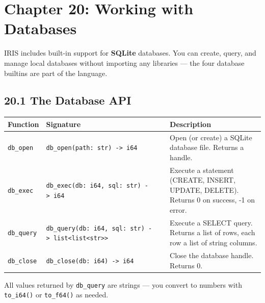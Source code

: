 \documentclass[
  english,
]{book}
\begin{document}
\section{Chapter 20: Working with
Databases}\label{chapter-20-working-with-databases}

IRIS includes built-in support for \textbf{SQLite} databases. You can
create, query, and manage local databases without importing any
libraries --- the four database builtins are part of the language.

\subsection{20.1 The Database API}\label{the-database-api}

\begin{longtable}[]{@{}
  >{\raggedright\arraybackslash}p{}
  >{\raggedright\arraybackslash}p{}
  >{\raggedright\arraybackslash}p{}@{}}
\toprule\noalign{}
\begin{minipage}[b]{\linewidth}\raggedright
Function
\end{minipage} & \begin{minipage}[b]{\linewidth}\raggedright
Signature
\end{minipage} & \begin{minipage}[b]{\linewidth}\raggedright
Description
\end{minipage} \\
\midrule\noalign{}
\endhead
\bottomrule\noalign{}
\endlastfoot
\texttt{db\_open} & \texttt{db\_open(path:\ str)\ -\textgreater{}\ i64}
& Open (or create) a SQLite database file. Returns a handle. \\
\texttt{db\_exec} &
\texttt{db\_exec(db:\ i64,\ sql:\ str)\ -\textgreater{}\ i64} & Execute
a statement (CREATE, INSERT, UPDATE, DELETE). Returns 0 on success, -1
on error. \\
\texttt{db\_query} &
\texttt{db\_query(db:\ i64,\ sql:\ str)\ -\textgreater{}\ list\textless{}list\textless{}str\textgreater{}\textgreater{}}
& Execute a SELECT query. Returns a list of rows, each row a list of
string columns. \\
\texttt{db\_close} & \texttt{db\_close(db:\ i64)\ -\textgreater{}\ i64}
& Close the database handle. Returns 0. \\
\end{longtable}

All values returned by \texttt{db\_query} are strings --- you convert to
numbers with \texttt{to\_i64()} or \texttt{to\_f64()} as needed.
\end{document}

